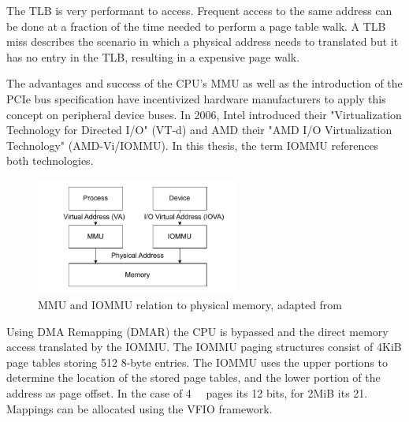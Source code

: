 The TLB is very performant to access. Frequent access to the same address can be done at a fraction of the time needed to perform a page table walk. A TLB miss describes the scenario in which a physical address needs to translated but it has no entry in the TLB, resulting in a expensive page walk.

The advantages and success of the CPU's MMU as well as the introduction of the PCIe bus specification have incentivized hardware manufacturers to apply this concept on peripheral device buses. In 2006, Intel introduced their "Virtualization Technology for Directed I/O" (VT-d) and AMD their "AMD I/O Virtualization Technology" (AMD-Vi/IOMMU). In this thesis, the term IOMMU references both technologies.

\begin{figure}
    \centering
    \includegraphics[width=0.6\textwidth]{figures/MMUIOMMU.pdf}
    \caption{MMU and IOMMU relation to physical memory, adapted from \cite{iommuscalability}}
    \label{fig:mmuvsiommu}
\end{figure}

Using DMA Remapping (DMAR) the CPU is bypassed and the direct memory access translated by the IOMMU.
The IOMMU paging structures consist of 4KiB page tables storing 512 8-byte entries. The IOMMU uses the upper portions to determine the location of the stored page tables, and the lower portion of the address as page offset. In the case of \qty{4}{\kibi\byte} pages its 12 bits, for 2MiB its 21.
Mappings can be allocated using the VFIO framework.


